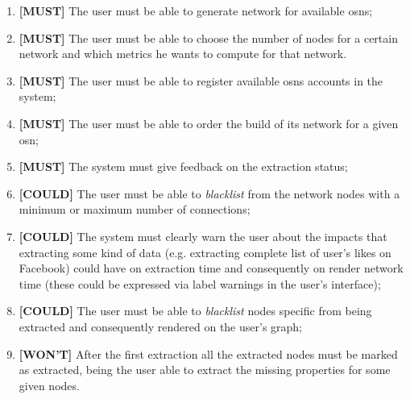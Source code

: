 \begin{enumerate}
    \item \textbf{[MUST]} The user must be able to generate network for available \glspl{osn};
    \item \textbf{[MUST]} The user must be able to choose the number of nodes for a certain network and which metrics he wants to compute
    for that network.
    \item \textbf{[MUST]} The user must be able to register available \glspl{osn} accounts in the system;
    \item \textbf{[MUST]} The user must be able to order the build of its network for a given \gls{osn};
    \item \textbf{[MUST]} The system must give feedback on the extraction status;
    \item \textbf{[COULD]} The user must be able to \textit{blacklist} from the network nodes with a minimum or maximum number of connections;
    \item \textbf{[COULD]} The system must clearly warn the user about the impacts that extracting some kind of data (e.g. extracting complete list of user's likes on Facebook) could have on extraction time and consequently on render network time (these could be expressed via label warnings in the user's interface);
    \item \textbf{[COULD]} The user must be able to \textit{blacklist} nodes specific from being extracted and consequently rendered on the user's graph;
    \item \textbf{[WON'T]} After the first extraction all the extracted nodes must be marked as extracted, being the user able to extract the missing properties for some given nodes.
\end{enumerate}
